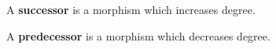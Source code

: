 \begin{definition} A \textbf{successor} is a morphism which increases degree.
\end{definition}

\begin{definition} A \textbf{predecessor} is a morphism which decreases degree.
\end{definition} 








